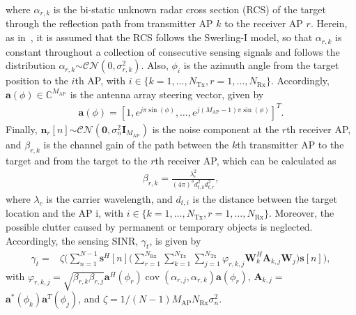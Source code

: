\documentclass[conference,twocolumn,a4paper]{IEEEtran}
\theoremstyle{remark} \newtheorem{remark}{Remark}
\begin{document}
where $\alpha_{r,k}$ is the bi-static unknown radar cross section (RCS) of the target through the reflection path from transmitter AP $k$ to the receiver AP $r$. Herein, as in~\cite{Art:Emil}, it is assumed that the RCS follows the Swerling-I model, so that $\alpha_{r,k}$ is constant throughout a collection of consecutive sensing signals and follows the distribution $\alpha_{r,k}$$\sim$$\mathcal{CN}(0,\sigma_{r,k}^2)$. Also, $\phi_i$ is the azimuth angle from the target position to the $i$th AP, with $i \in \{k = 1, \dots, N_{\mathrm{Tx}},r = 1, \dots, N_{\mathrm{Rx}}\}$. 
Accordingly, $\mathbf{a}(\phi) \in \mathbb{C}^{M_{\mathrm{AP}}}$ is the antenna array steering vector, given by
\begin{align}
    \mathbf{a}(\phi)\!\!=\!\!\left[
        1, e^{j\pi\sin(\phi)}, \dots, e^{j(M_{\mathrm{AP}}\!-\!1)\pi\sin(\phi)}\right]^T\!\!\!\!.
\end{align}
Finally, $\mathbf{n}_r[n]$$\sim$$\mathcal{CN}(\mathbf{0},\sigma_n^2\mathbf{I}_{M_{\mathrm{AP}}})$ is the noise component at the $r$th receiver AP, and $\beta_{r,k}$ is the channel gain of the path between the $k$th transmitter AP to the target and from the target to the $r$th receiver AP, which can be calculated as~\cite{Art:Emil} %
\begin{align}
    \beta_{r,k} = \frac{\lambda_c^2}{(4\pi)^3d_{t,k}^2d_{t,r}^2},
\end{align}
where $\lambda_c$ is the carrier wavelength, and $d_{t,i}$ is the distance between the target location and the AP i, with $i \in \{k = 1, \dots, N_{\mathrm{Tx}},r = 1, \dots, N_{\mathrm{Rx}}\}$. Moreover, the possible clutter caused by permanent or temporary objects is neglected. Accordingly, the sensing SINR, $\gamma_t$, is given by%
\begin{align}\label{eq:gammat}
    \gamma_t\!=&\zeta\!\Bigg(\!\sum_{n=1}^{N-1}\!\!\mathbf{s}^H\![n]\!\Bigg(\!\sum_{r=1}^{N_{\mathrm{Rx}}}\! \sum_{k=1}^{N_{\mathrm{Tx}}}\! \sum_{j=1}^{N_{\mathrm{Tx}}}\! \varphi_{r,k,j}\mathbf{W}_k^H\mathbf{A}_{k,j}\mathbf{W}_j\!\Bigg) \!\mathbf{s}[n]\!\Bigg)\!,
\end{align}
with $\varphi_{r,k,j} = \sqrt{\beta_{r,k} \beta_{r,j}}\mathbf{a}^H\left(\phi_r\right)\operatorname{cov}\left(\alpha_{r, j}, \alpha_{r, k}\right) \mathbf{a}\left(\phi_r\right)$, $\mathbf{A}_{k,j}$$=$$\mathbf{a}^*\!\left(\phi_k\right)\mathbf{a}^T\!\left(\phi_j\right)$, and $\zeta$$=$$1/(N\!-1\!)M_{\mathrm{AP}}N_{\mathrm{Rx}}\sigma_n^2$.
\end{document}
